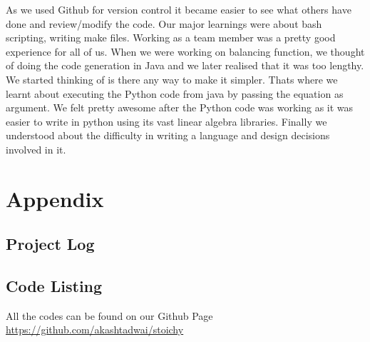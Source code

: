 \documentclass[english,a4paper,12pt]{report}
\begin{document}
   \hspace{2cm} As we used Github for version control it became easier to see what others have done and review/modify the code. Our major learnings were about bash scripting, writing make files. Working as a team member was a pretty good experience for all of us. When we were working on balancing function, we thought of doing the code generation in Java and we later realised that it was too lengthy. We started thinking of is there any way to make it simpler. Thats where we learnt about executing the Python code from java by passing the equation as argument. We felt pretty awesome after the Python code was working as it was easier to write in python using its vast linear algebra libraries. Finally we understood about the difficulty in writing a language and design decisions involved in it.
\chapter{Appendix}
\section{Project Log}
\label{Project log}

\section{Code Listing}
    All the codes can be found on our Github Page \url{https://github.com/akashtadwai/stoichy}
\end{document}
